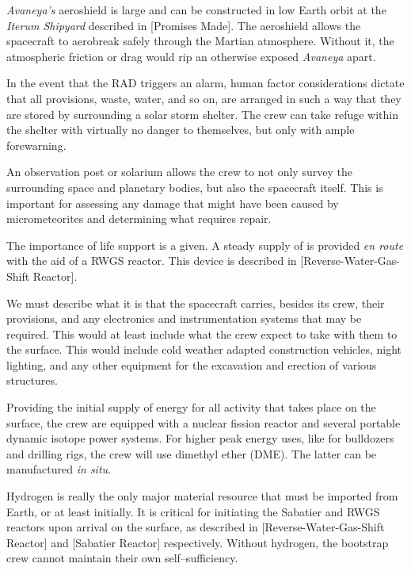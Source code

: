 
{\it Avaneya's} aeroshield is large and can be constructed in low Earth orbit at the {\it Iterum Shipyard} described in [Promises Made]. The aeroshield allows the spacecraft to aerobreak safely through the Martian atmosphere. Without it, the atmospheric friction or drag would rip an otherwise exposed {\it Avaneya} apart.

In the event that the RAD triggers an alarm, human factor considerations dictate that all provisions, waste, water, and so on, are arranged in such a way that they are stored by surrounding a solar storm shelter. The crew can take refuge within the shelter with virtually no danger to themselves, but only with ample forewarning.

An observation post or solarium allows the crew to not only survey the surrounding space and planetary bodies, but also the spacecraft itself. This is important for assessing any damage that might have been caused by micrometeorites and determining what requires repair.

The importance of life support is a given. A steady supply of  is provided {\it en route} with the aid of a RWGS reactor. This device is described in [Reverse-Water-Gas-Shift Reactor].

We must describe what it is that the spacecraft carries, besides its crew, their provisions, and any electronics and instrumentation systems that may be required. This would at least include what the crew expect to take with them to the surface. This would include cold weather adapted construction vehicles, night lighting, and any other equipment for the excavation and erection of various structures. 

Providing the initial supply of energy for all activity that takes place on the surface, the crew are equipped with a nuclear fission reactor and several portable dynamic isotope power systems. For higher peak energy uses, like for bulldozers and drilling rigs, the crew will use dimethyl ether  (DME). The latter can be manufactured {\it in situ}.

Hydrogen is really the only major material resource that must be imported from Earth, or at least initially.  It is critical for initiating the Sabatier and RWGS reactors upon arrival on the surface, as described in [Reverse-Water-Gas-Shift Reactor] and [Sabatier Reactor] respectively. Without hydrogen, the bootstrap crew cannot maintain their own self--sufficiency. 

